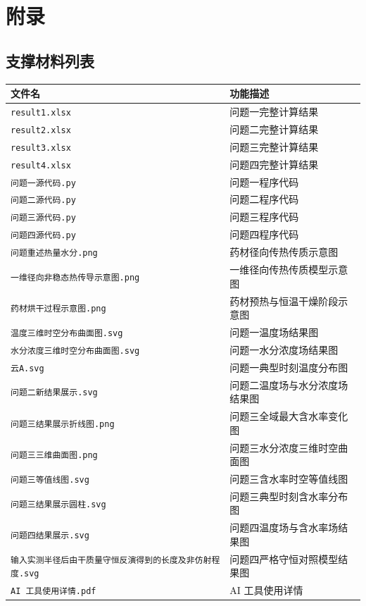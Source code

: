 \documentclass[withoutpreface,bwprint]{cumcmthesis}
\begin{document}
\section*{附录}
\setcounter{figure}{0}
\setcounter{table}{0}

\subsection*{\centering 支撑材料列表}

\begin{table}[H]
\centering
\small
\renewcommand{\arraystretch}{1.12}
\begin{tabularx}{0.92\textwidth}{>{\raggedright\arraybackslash}p{}>{\raggedright\arraybackslash}X}
\toprule
文件名 & 功能描述 \\
\midrule
\texttt{result1.xlsx} & 问题一完整计算结果 \\
\texttt{result2.xlsx} & 问题二完整计算结果 \\
\texttt{result3.xlsx} & 问题三完整计算结果 \\
\texttt{result4.xlsx} & 问题四完整计算结果 \\
\texttt{问题一源代码.py} & 问题一程序代码 \\
\texttt{问题二源代码.py} & 问题二程序代码 \\
\texttt{问题三源代码.py} & 问题三程序代码 \\
\texttt{问题四源代码.py} & 问题四程序代码 \\
\texttt{问题重述热量水分.png} & 药材径向传热传质示意图 \\
\texttt{一维径向非稳态热传导示意图.png} & 一维径向传热传质模型示意图 \\
\texttt{药材烘干过程示意图.png} & 药材预热与恒温干燥阶段示意图 \\
\texttt{温度三维时空分布曲面图.svg} & 问题一温度场结果图 \\
\texttt{水分浓度三维时空分布曲面图.svg} & 问题一水分浓度场结果图 \\
\texttt{云A.svg} & 问题一典型时刻温度分布图 \\
\texttt{问题二新结果展示.svg} & 问题二温度场与水分浓度场结果图 \\
\texttt{问题三结果展示折线图.png} & 问题三全域最大含水率变化图 \\
\texttt{问题三三维曲面图.png} & 问题三水分浓度三维时空曲面图 \\
\texttt{问题三等值线图.svg} & 问题三含水率时空等值线图 \\
\texttt{问题三结果展示圆柱.svg} & 问题三典型时刻含水率分布图 \\
\texttt{问题四结果展示.svg} & 问题四温度场与含水率场结果图 \\
\texttt{输入实测半径后由干质量守恒反演得到的长度及非仿射程度.svg} & 问题四严格守恒对照模型结果图 \\
\texttt{AI 工具使用详情.pdf} & AI 工具使用详情 \\
\bottomrule
\end{tabularx}
\end{table}
\end{document}
